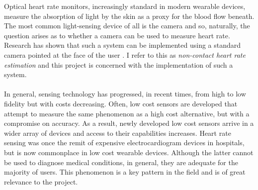 Optical heart rate monitors, increasingly standard in modern wearable devices, measure the absorption of light
by the skin as a proxy for the blood flow beneath.
The most common light-sensing device of all is the camera and so, naturally, the question arises as to whether a camera can be used to measure heart rate.
Research has shown that such a system can be implemented using a standard camera pointed at the face of the user \cite{poh2010non}\cite{vanderKooij2019}\cite{Verkruysse2008}. I refer to this as \textit{non-contact heart rate estimation} and this project is concerned with the implementation of such a system.
\\\\
In general, sensing technology has progressed, in recent times, from high to low fidelity but with costs decreasing.
Often, low cost sensors are developed that attempt to measure the same phenomenon as a high cost alternative, but with a compromise on accuracy.
As a result, newly developed low cost sensors arrive in a wider array of devices and access to their capabilities increases.
Heart rate sensing was once the remit of expensive electrocardiogram devices in hospitals, but is now commonplace in low cost wearable devices. Although the latter cannot be used to diagnose medical conditions, in general, they are adequate for the majority of users. This phenomenon
is a key pattern in the field and is of great relevance to the project.
\\\\
